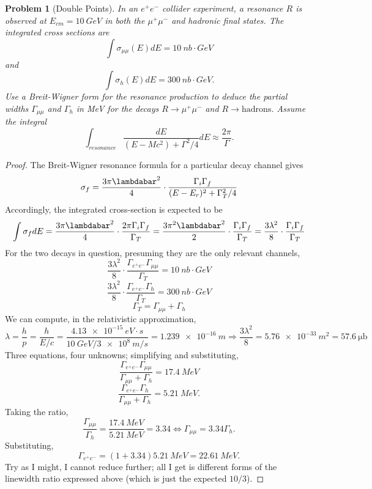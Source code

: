 \documentclass{article}
\newtheorem{plm}{Problem}
\begin{document}
\begin{plm}[Double Points]
  In an $e^{+}e^{-}$ collider experiment, a resonance $R$ is observed at $E_{cm} = \SI{10}{GeV}$ in both the $\mu^{+}\mu^{-}$
  and hadronic final states.
  The integrated cross sections are
  \[
    \int \sigma_{\mu \mu}(E)dE = \SI{10}{nb \cdot GeV}
  \]
  and
  \[
    \int \sigma_{h}(E)dE = \SI{300}{nb \cdot GeV}.
  \]
  Use a Breit-Wigner form for the resonance production to deduce the partial widths $\Gamma_{\mu\mu}$ and $\Gamma_{h}$ in \si{MeV}
  for the decays $R \to \mu^{+}\mu^{-}$ and $R \to \text{hadrons}$.
  Assume the integral
  \[
    \int_{resonance}\frac{dE}{(E - Mc^{2}) + \Gamma^{2}/4}dE \approx \frac{2\pi}{\Gamma}.
  \]
\end{plm}

\begin{proof}
  The Breit-Wigner resonance formula for a particular decay channel gives
  \[
    \sigma_{f} = \frac{3\pi\lambdabar^{2}}{4} \cdot \frac{\Gamma_{i}\Gamma_{f}}{(E - E_{r})^{2} + \Gamma_{T}^{2}/4}
  \]
  Accordingly, the integrated cross-section is expected to be
  \[
    \int\sigma_{f} dE = \frac{3\pi\lambdabar^{2}}{4} \cdot \frac{2 \pi \Gamma_{i}\Gamma_{f}}{\Gamma_{T}}
    = \frac{3\pi^{2}\lambdabar^{2}}{2} \cdot \frac{\Gamma_{i}\Gamma_{f}}{\Gamma_{T}}
    = \frac{3\lambda^{2}}{8} \cdot \frac{\Gamma_{i}\Gamma_{f}}{\Gamma_{T}}
  \]
  For the two decays in question, presuming they are the only relevant channels,
  \[
    \frac{3\lambda^{2}}{8} \cdot \frac{\Gamma_{e^{+}e^{-}}\Gamma_{\mu\mu}}{\Gamma_{T}} = \SI{10}{nb \cdot GeV}
  \]
  \[
    \frac{3\lambda^{2}}{8} \cdot \frac{\Gamma_{e^{+}e^{-}}\Gamma_{h}}{\Gamma_{T}} = \SI{300}{nb \cdot GeV}
  \]
  \[
    \Gamma_{T} = \Gamma_{\mu\mu} + \Gamma_{h}
  \]
  We can compute, in the relativistic approximation,
  \[
    \lambda = \frac{h}{p} = \frac{h}{E/c} = \frac{\SI{4.13e-15}{eV \cdot s}}{\SI{10}{GeV} / \SI{3e8}{m/s}}
    = \SI{1.239e-16}{m}
    \Rightarrow \frac{3\lambda^{2}}{8} = \SI{5.76e-33}{m^{2}} = \SI{57.6}{\micro\barn}
  \]
  Three equations, four unknowns; simplifying and substituting,
  \[
    \frac{\Gamma_{e^{+}e^{-}}\Gamma_{\mu\mu}}{\Gamma_{\mu\mu} + \Gamma_{h}} = \SI{17.4}{MeV}
  \]
  \[
    \frac{\Gamma_{e^{+}e^{-}}\Gamma_{h}}{\Gamma_{\mu\mu} + \Gamma_{h}} = \SI{5.21}{MeV}.
  \]
  Taking the ratio,
  \[
    \frac{\Gamma_{\mu\mu}}{\Gamma_{h}} = \frac{\SI{17.4}{MeV}}{\SI{5.21}{MeV}} = 3.34
    \Leftrightarrow \Gamma_{\mu\mu} = 3.34\Gamma_{h}.
  \]
  Substituting,
  \[
    \Gamma_{e^{+}e^{-}} = (1 + 3.34)\SI{5.21}{MeV} = \SI{22.61}{MeV}.
  \]
  Try as I might, I cannot reduce further; all I get is different forms of the linewidth ratio expressed above
  (which is just the expected $10/3$).
\end{proof}
\end{document}
